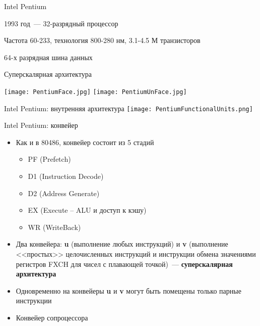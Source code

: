 \documentclass[aspectratio=169,14pt]{beamer}
\begin{document}
\begin{frame}{Intel Pentium}
    \begin{itemize}
        \begin{spacing}{0.8}
            \item 1993 год~--- 32-разрядный процессор
            \item Частота 60-233, технология 800-280 нм, 3.1-4.5 М транзисторов
            \item 64-х разрядная шина данных
            \item Суперскалярная архитектура
        \end{spacing}
        \pause
    \end{itemize}

    \texttt{[image: PentiumFace.jpg]}
    \texttt{[image: PentiumUnFace.jpg]}
\end{frame}

\begin{frame}{Intel Pentium: внутренняя архитектура}
    \texttt{[image: PentiumFunctionalUnits.png]}
\end{frame}

\begin{frame}{Intel Pentium: конвейер}
    \begin{itemize}
        \item Как и в 80486, конвейер состоит из 5 стадий
        \begin{itemize}
            \item PF (Prefetch)
            \item D1 (Instruction Decode)
            \item D2 (Address Generate)
            \item EX (Execute – ALU и доступ к кэшу)
            \item WR (WriteBack)
        \end{itemize}
        \item Два конвейера: \textbf{u} (выполнение любых инструкций)
        и \textbf{v} (выполнение <<простых>> целочисленных инструкций
        и инструкции обмена значениями регистров FXCH для чисел с
        плавающей точкой)~--- \textbf{суперскалярная архитектура}
        \item Одновременно на конвейеры \textbf{u} и \textbf{v} могут быть помещены только парные инструкции
        \item Конвейер сопроцессора
    \end{itemize}
\end{frame}
\end{document}
